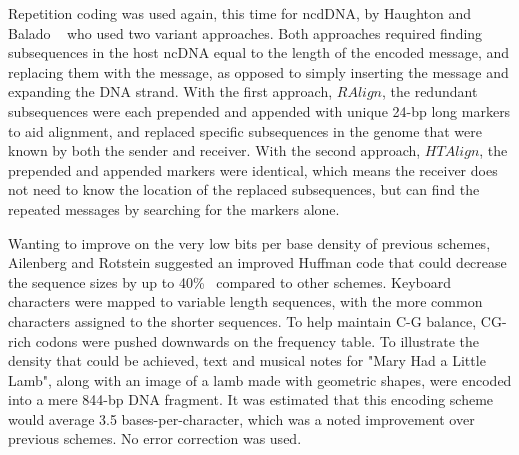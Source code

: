 \documentclass[USenglish,oneside,twocolumn]{article}
\begin{document}
Repetition coding was used again, this time for ncdDNA, by Haughton and Balado ~\cite{HB2011IEEEICOBAB} who used two variant approaches. Both approaches required finding subsequences in the host ncDNA equal to the length of the encoded message, and replacing them with the message, as opposed to simply inserting the message and expanding the DNA strand. With the first approach, $RAlign$, the redundant subsequences were each prepended and appended with unique 24-bp long markers to aid alignment, and replaced specific subsequences in the genome that were known by both the sender and receiver. With the second approach, $HTAlign$, the prepended and appended markers were identical, which means the receiver does not need to know the location of the replaced subsequences, but can find the repeated messages by searching for the markers alone.

Wanting to improve on the very low bits per base density of previous schemes, Ailenberg and Rotstein suggested an improved Huffman code that could decrease the sequence sizes by up to 40\%~\cite{AR2009BT} compared to other schemes. Keyboard characters were mapped to variable length sequences, with the more common characters assigned to the shorter sequences. To help maintain C-G balance, CG-rich codons were pushed downwards on the frequency table. To illustrate the density that could be achieved, text and musical notes for "Mary Had a Little Lamb", along with an image of a lamb made with geometric shapes, were encoded into a mere 844-bp DNA fragment. It was estimated that this encoding scheme would average 3.5 bases-per-character, which was a noted improvement over previous schemes. No error correction was used.
\end{document}
